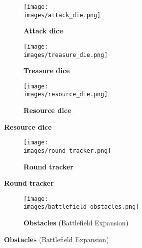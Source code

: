 \vspace*{-2em}
\begin{paracol}{2}
\begin{figure}[H]
  \centering
  \begin{subfigure}[b]{0.3\linewidth}
    \centering
    \texttt{[image: \\images/attack\_die.png]}
    \caption{\textbf{Attack dice}}
  \end{subfigure}
  \begin{subfigure}[b]{0.3\linewidth}
    \centering
    \texttt{[image: \\images/treasure\_die.png]}
    \caption{\textbf{Treasure dice}}
  \end{subfigure}
  \begin{subfigure}[b]{0.3\linewidth}
    \centering
    \texttt{[image: \\images/resource\_die.png]}
    \caption{\textbf{Resource dice}}
  \end{subfigure}
\end{figure}
\vspace*{-1em}
\begin{figure}[H]
  \centering
  \begin{subfigure}[b]{\linewidth}
    \centering
    \texttt{[image: \\images/round-tracker.png]}
    \caption{\textbf{Round tracker}}
  \end{subfigure}
\end{figure}
\switchcolumn
\begin{figure}[H]
  \vspace*{1em}
  \centering
  \begin{subfigure}[b]{\linewidth}
    \centering
    \texttt{[image: \\images/battlefield-obstacles.png]}
    \caption{\textbf{Obstacles} (Battlefield Expansion)}
  \end{subfigure}
\end{figure}
\end{paracol}
